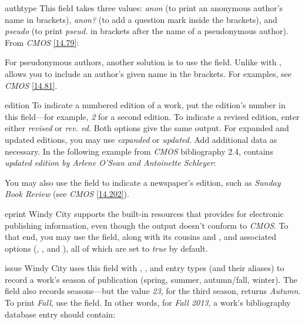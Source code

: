 \documentclass[11pt,letterpaper,oneside]{article}
\begin{document}
\begin{marglist}

\item[authtype] This field takes three values: \textit{anon} (to print
an anonymous author's name in brackets), \textit{anon?} (to add a
question mark inside the brackets), and \textit{pseudo} (to print
\textit{pseud.} in brackets after the name of a pseudonymous author).
From \textit{CMOS} \ref{14.79}:

\begin{citebib}
\item \cite{horsley1796}
\item \cite{hawkes1834}
\end{citebib}

For pseudonymous authors, another solution is to use the
 field. Unlike with ,
 allows you to include an author's given name in
the brackets. For examples, see \textit{CMOS} \ref{14.81}.

\item[edition] To indicate a numbered edition of a work, put the
edition's number in this field---for example, \textit{2} for a second
edition. To indicate a revised edition, enter either \textit{revised}
or \textit{rev. ed.} Both options give the same output. For expanded
and updated editions, you may use \textit{expanded} or
\textit{updated}. Add additional data as necessary. In the following
example from \textit{CMOS} bibliography 2.4, 
contains \textit{updated edition by Arlene O'Sean and Antoinette
Schleyer}:

\begin{bibonly}
\nocite{swanson1999}
\end{bibonly}

\noindent You may also use the field to indicate a newspaper's
edition, such as \textit{Sunday Book Review} (see \textit{CMOS}
\ref{14.202}).

\item[eprint] Windy City supports the built-in resources that
\biblatex provides for electronic publishing information, even though
the output doesn't conform to \textit{CMOS}. To that end, you may use
the  field, along with its cousins
 and , and associated
options (, , and ), all of which are set
to \textit{true} by default.

\item[issue] Windy City uses this field with ,
, and  entry types (and their aliases)
to record a work's season of publication (spring, summer, autumn/fall,
winter). The  field also records seasons---but the value
\textit{23}, for the third season, returns \textit{Autumn}. To print
\textit{Fall}, use the  field. In other words, for
\textit{Fall 2013}, a work's bibliography database entry should
contain:


\end{marglist}
\end{document}
